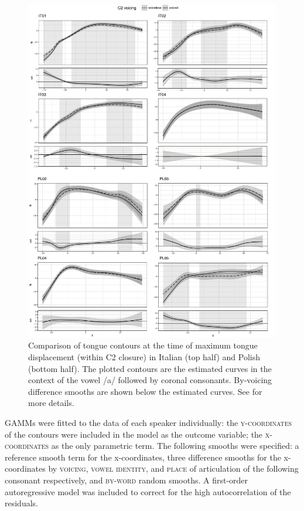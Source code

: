 \documentclass[authoryear, twocolumn]{elsarticle}
\begin{document}
\begin{figure}
    \centering
    \includegraphics[height=.9\textheight]{fig/tra.pdf}
    \caption{Comparison of tongue contours at the time of maximum tongue displacement (within C2 closure) in Italian (top half) and Polish (bottom half). The plotted contours are the estimated curves in the context of the vowel /a/ followed by coronal consonants. By-voicing difference smooths are shown below the estimated curves. See  for more details.}
    \label{f:tra}
\end{figure}

GAMMs were fitted to the data of each speaker individually: the
\textsc{y-coordinates} of the contours were included in the model as the
outcome variable; the \textsc{x-coordinates} as the only parametric
term. The following smooths were specified: a reference smooth term for
the x-coordinates, three difference smooths for the x-coordinates by
\textsc{voicing}, \textsc{vowel identity}, and \textsc{place} of
articulation of the following consonant respectively, and
\textsc{by-word} random smooths. A first-order autoregressive model was
included to correct for the high autocorrelation of the residuals.
\end{document}
